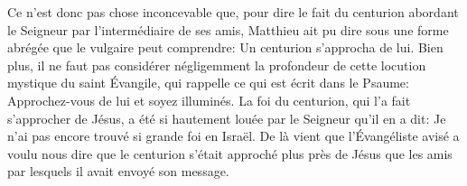 Ce n’est donc pas chose inconcevable
	que, pour dire le fait du centurion abordant le Seigneur
		par l’intermédiaire de ses amis,
	Matthieu ait pu dire sous une forme abrégée que le vulgaire peut comprendre:
	Un centurion s’approcha de lui.
Bien plus, il ne faut pas considérer négligemment
		la profondeur de cette locution mystique du saint Évangile,
	qui rappelle ce qui est écrit dans le Psaume:
	Approchez-vous de lui et soyez illuminés.
La foi du centurion, qui l’a fait s’approcher de Jésus,
	a été si hautement louée par le Seigneur qu’il en a dit:
	Je n’ai pas encore trouvé si grande foi en Israël.
De là vient que l’Évangéliste avisé a voulu nous dire
		que le centurion s’était approché plus près de Jésus
	que les amis par lesquels il avait envoyé son message.
